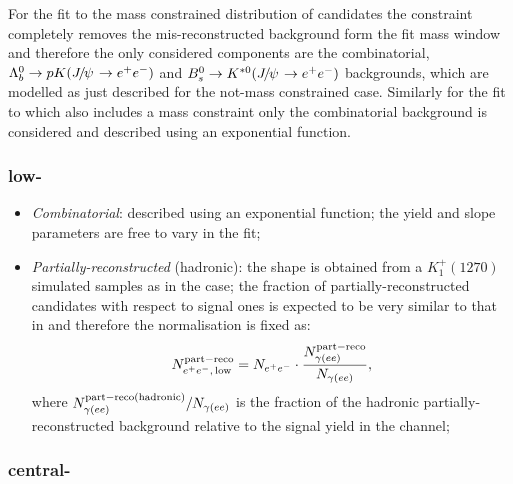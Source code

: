 For the fit to the mass constrained distribution of \BdToKstJPsee candidates the constraint completely removes the mis-reconstructed 
background form the fit mass window and therefore the only considered components are the combinatorial, $\Lb\to pK(\jpsi\to\ee)$ and  
$\Bs\to\Kstarz(\jpsi\to\ee)$ backgrounds, which are modelled as just described for the not-mass constrained case.
Similarly for the fit to \BdToKstPsiee which also includes a \psitwos mass constraint only the combinatorial background is considered
and described using an exponential function.

\subsubsection*{\BdToKstee low-\qsq}

\begin{itemize}

\item \textit{Combinatorial}: described using an exponential function; the yield and slope parameters are free to vary in the fit;

\item \textit{Partially-reconstructed} (hadronic): the shape is obtained from a $K_1^+(1270)$ simulated samples as in the \BdToKstGee case;
the fraction of partially-reconstructed candidates with respect to signal ones is expected to be very similar to that
in \BdToKstGee and therefore the normalisation is fixed as:
%
$$N_{e^+ e^-, \, {\rm low}}^{\rm part-reco} = N_{e^+ e^-} \cdot \frac{N_{\gamma(ee)}^{\rm part-reco}}{N_{\gamma(ee)}},$$
%
where $N_{\gamma(ee)}^{\rm part-reco (hadronic)}/N_{\gamma(ee)}$ is the fraction of the hadronic partially-reconstructed background relative to the signal yield in the \BdToKstGee channel;

\end{itemize}


\subsubsection*{\BdToKstee central-\qsq}

